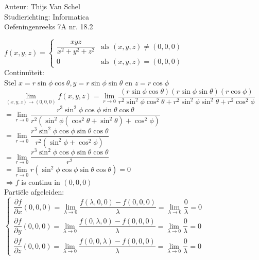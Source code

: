 \documentclass[a4paper]{article}
\newcommand{\dlim}{\lim\limits}
\begin{document}
  
\noindent \large Auteur: Thijs Van Schel \\
\noindent \large Studierichting: Informatica\\
\noindent \large Oefeningenreeks 7A nr. 18.2\\

\medskip

\normalsize

$f(x,y,z) = 
\left\{ 
\begin{array}{ll} 
\dfrac{xyz}{x^2+y^2+z^2} & \text{als } (x,y,z) \neq (0,0,0)\\ 
0 & \text{als } (x,y,z) = (0,0,0) 
\end{array} 
\right.$ \\

Continuïteit:\\

Stel $x = r \sin \phi \cos \theta, y = r \sin \phi \sin \theta$ en $z = r \cos \phi$\\

$\dlim_{(x,y,z)\rightarrow (0,0,0)} f(x,y,z) = \dlim_{r\rightarrow 0} \dfrac{(r \sin \phi \cos \theta)(r \sin \phi \sin \theta)(r \cos \phi)}{r^2 \sin^2 \phi \cos^2 \theta + r^2 \sin^2 \phi \sin^2 \theta + r^2 \cos^2 \phi}$\\

$= \dlim_{r\rightarrow 0} \dfrac{r^3 \sin^2 \phi \cos \phi \sin \theta \cos \theta}{r^2 (\sin^2 \phi (\cos^2 \theta + \sin^2 \theta) + \cos^2 \phi)}$\\

$= \dlim_{r\rightarrow 0} \dfrac{r^3 \sin^2 \phi \cos \phi \sin \theta \cos \theta}{r^2 (\sin^2 \phi + \cos^2 \phi)}$\\

$= \dlim_{r\rightarrow 0} \dfrac{r^3 \sin^2 \phi \cos \phi \sin \theta \cos \theta}{r^2}$\\

$= \dlim_{r\rightarrow 0} r (\sin^2 \phi \cos \phi \sin \theta \cos \theta) = 0$\\

$\Rightarrow f$ is continu in $(0,0,0)$ \\

Partiële afgeleiden:\\

$\left\{ 
\begin{array}{l} 
\dfrac{\partial f}{\partial x}(0,0,0) = \dlim_{\lambda \rightarrow 0} \dfrac{f(\lambda,0,0) - f(0,0,0)}{\lambda} = \dlim_{\lambda \rightarrow 0} \dfrac{0}{\lambda} = 0 \\ 
\dfrac{\partial f}{\partial y}(0,0,0) = \dlim_{\lambda \rightarrow 0} \dfrac{f(0,\lambda,0) - f(0,0,0)}{\lambda} = \dlim_{\lambda \rightarrow 0} \dfrac{0}{\lambda} = 0 \\
\dfrac{\partial f}{\partial z}(0,0,0) = \dlim_{\lambda \rightarrow 0} \dfrac{f(0,0,\lambda) - f(0,0,0)}{\lambda} = \dlim_{\lambda \rightarrow 0} \dfrac{0}{\lambda} = 0 
\end{array} 
\right.$ \\
\end{document}

